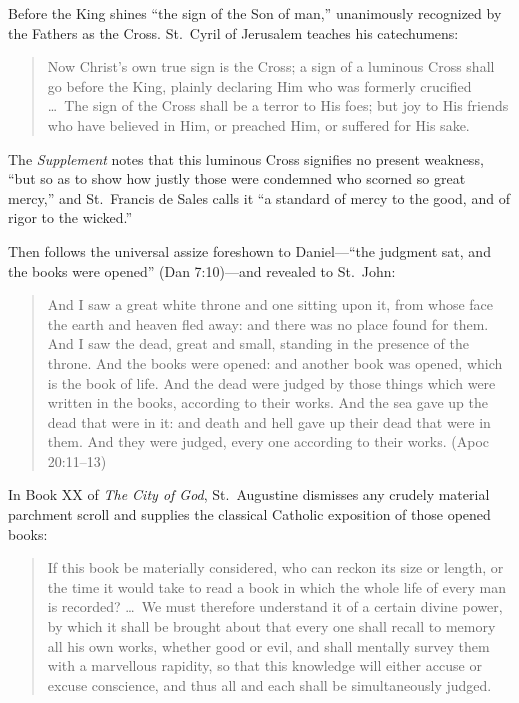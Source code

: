 Before the King shines ``the sign of the Son of man,'' unanimously recognized by the Fathers as the Cross. St.\ Cyril of Jerusalem teaches his catechumens:

\begin{quote}
Now Christ's own true sign is the Cross; a sign of a luminous Cross shall go before the King, plainly declaring Him who was formerly crucified \dots\ The sign of the Cross shall be a terror to His foes; but joy to His friends who have believed in Him, or preached Him, or suffered for His sake.
\end{quote}

The \textit{Supplement} notes that this luminous Cross signifies no present weakness, ``but so as to show how justly those were condemned who scorned so great mercy,'' and St.\ Francis de Sales calls it ``a standard of mercy to the good, and of rigor to the wicked.''

Then follows the universal assize foreshown to Daniel---``the judgment sat, and the books were opened'' (Dan 7:10)---and revealed to St.\ John:

\begin{quote}
And I saw a great white throne and one sitting upon it, from whose face the earth and heaven fled away: and there was no place found for them. And I saw the dead, great and small, standing in the presence of the throne. And the books were opened: and another book was opened, which is the book of life. And the dead were judged by those things which were written in the books, according to their works. And the sea gave up the dead that were in it: and death and hell gave up their dead that were in them. And they were judged, every one according to their works. (Apoc 20:11--13)
\end{quote}

In Book XX of \textit{The City of God}, St.\ Augustine dismisses any crudely material parchment scroll and supplies the classical Catholic exposition of those opened books:

\begin{quote}
If this book be materially considered, who can reckon its size or length, or the time it would take to read a book in which the whole life of every man is recorded? \dots\ We must therefore understand it of a certain divine power, by which it shall be brought about that every one shall recall to memory all his own works, whether good or evil, and shall mentally survey them with a marvellous rapidity, so that this knowledge will either accuse or excuse conscience, and thus all and each shall be simultaneously judged.
\end{quote}

